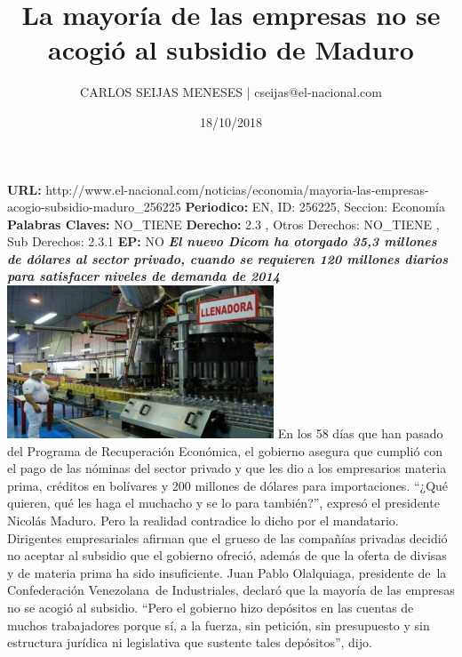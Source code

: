 \documentclass{article}%
\title{\textbf{La mayoría de las empresas no se acogió al subsidio de Maduro}}%
\author{CARLOS SEIJAS MENESES | cseijas@el{-}nacional.com}%
\date{18/10/2018}%
\begin{document}
%
\normalsize%
\maketitle%
\textbf{URL: }%
http://www.el{-}nacional.com/noticias/economia/mayoria{-}las{-}empresas{-}acogio{-}subsidio{-}maduro\_256225\newline%
%
\textbf{Periodico: }%
EN, %
ID: %
256225, %
Seccion: %
Economía\newline%
%
\textbf{Palabras Claves: }%
NO\_TIENE\newline%
%
\textbf{Derecho: }%
2.3%
, Otros Derechos: %
NO\_TIENE%
, Sub Derechos: %
2.3.1%
\newline%
%
\textbf{EP: }%
NO\newline%
\newline%
%
\textbf{\textit{El nuevo Dicom ha otorgado 35,3 millones de dólares al sector privado, cuando se requieren 120 millones diarios para satisfacer niveles de demanda de 2014}}%
\newline%
\newline%
%
\includegraphics[width=300px]{155.jpg}%
\newline%
%
En los 58 días que han pasado del Programa de Recuperación Económica, el gobierno asegura que cumplió con el pago de las nóminas del sector privado y que les dio a los empresarios materia prima, créditos en bolívares y 200 millones de dólares para importaciones. “¿Qué quieren, qué les haga el muchacho y se lo para también?”, expresó el presidente Nicolás Maduro.%
\newline%
%
Pero la realidad contradice lo dicho por el mandatario. Dirigentes empresariales afirman que el grueso de las compañías privadas decidió no aceptar al subsidio que el gobierno ofreció, además de que la oferta de divisas y de materia prima ha sido insuficiente.%
\newline%
%
Juan Pablo Olalquiaga, presidente de~la Confederación Venezolana~de Industriales, declaró que la mayoría de las empresas no se acogió al subsidio. “Pero el gobierno hizo depósitos en las cuentas de muchos trabajadores porque sí, a la fuerza, sin petición, sin presupuesto y sin estructura jurídica ni legislativa que sustente tales depósitos”, dijo.%
\end{document}
